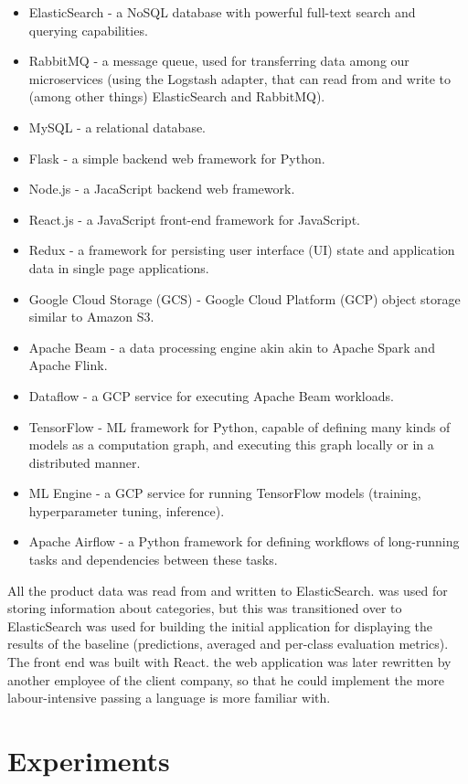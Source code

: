 \begin{itemize}
  \item ElasticSearch - a NoSQL database with powerful full-text search and querying capabilities.
  \item RabbitMQ - a message queue, used for transferring data among our microservices (using the Logstash adapter, that can read from and write to (among other things) ElasticSearch and RabbitMQ).
  \item MySQL - a relational database.
  \item Flask - a simple backend web framework for Python.
  \item Node.js - a JacaScript backend web framework.
  \item React.js - a JavaScript front-end framework for JavaScript.
  \item Redux - a framework for persisting user interface (UI) state and application data in single page applications.
  \item Google Cloud Storage (GCS) - Google Cloud Platform (GCP) object storage similar to Amazon S3.
  \item Apache Beam - a data processing engine akin akin to Apache Spark and Apache Flink.
  \item Dataflow - a GCP service for executing Apache Beam workloads.
  \item TensorFlow - ML framework for Python, capable of defining many kinds of models as a computation graph, and executing this graph locally or in a distributed manner.
  \item ML Engine - a GCP service for running TensorFlow models (training, hyperparameter tuning, inference).
  \item Apache Airflow - a Python framework for defining workflows of long-running tasks and dependencies between these tasks.
\end{itemize}



All the product data was read from and written to ElasticSearch.
was used for storing information about categories, but this was transitioned over to ElasticSearch
was used for building the initial application for displaying the results of the baseline (predictions, averaged and per-class evaluation metrics). The front end was built with React.
the web application was later rewritten by another employee of the client company, so  that he could implement the more labour-intensive  passing a language is more familiar with.

\section{Experiments}

